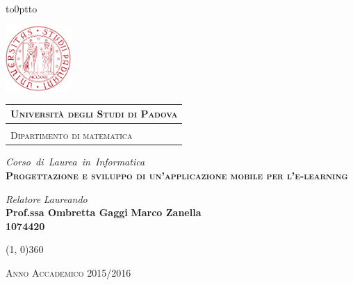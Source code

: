\begin{titlepage} %
\begin{center}
\vbox to0pt{\vbox to\textheight{\vfill %
\vfill}\vss}

\hspace{0.5cm}
\begin{minipage}{.20\textwidth}
  \includegraphics[height=2.5cm]{images/unipd-red}
\end{minipage}\begin{minipage}{.90\textwidth}
  \begin{table}[H]
  \begin{tabular}{l}
  \scshape{\Large{\bfseries{Università degli Studi di Padova}}} \\
  \hline \\
  \scshape{\Large{Dipartimento di matematica}} \\
  \end{tabular}
  \end{table}
\end{minipage}

\emph{\Large{Corso~di~Laurea~in~Informatica}} \\
\vspace{1.5cm}
\scshape{\Large{\bfseries{Progettazione e sviluppo di un'applicazione mobile per l'e-learning}}} \\
\end{center}

\vfill
\begin{normalsize}
\begin{flushleft}
  \hspace{30pt} \textit{Relatore} \hspace{200pt} \textit{Laureando}\\
  \vspace{5pt}
  \hspace{30pt} \large{\textbf{Prof.ssa Ombretta Gaggi}} \hspace{70pt} \large{\textbf{Marco Zanella}}\\
  \hspace{284pt} \large{\textbf{1074420}}
  \vspace{10pt}
\end{flushleft}
\end{normalsize}

\vfill
\begin{center}
\hspace{-0.2cm}
\line(1, 0){360}

\textsc{Anno Accademico 2015/2016}
\end{center}
\end{titlepage}